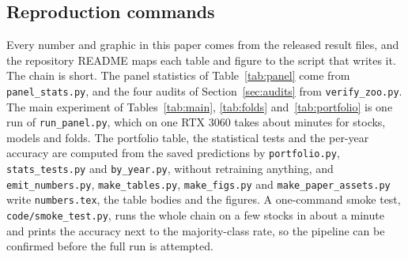 \documentclass[pdflatex,sn-mathphys-ay]{sn-jnl}
\theoremstyle{thmstyleone}%
\theoremstyle{thmstyletwo}%
\theoremstyle{thmstyletwo}%
\begin{document}
\begin{appendices}
	\section{Reproduction commands}\label{app1}

	Every number and graphic in this paper comes from the released result files, and the repository
	README maps each table and figure to the script that writes it. The chain is short. The panel
	statistics of Table~\ref{tab:panel} come from \texttt{panel\_stats.py}, and the four audits of
	Section~\ref{sec:audits} from \texttt{verify\_zoo.py}. The main experiment of
	Tables~\ref{tab:main}, \ref{tab:folds} and~\ref{tab:portfolio} is one run of
	\texttt{run\_panel.py}, which on one RTX 3060 takes about \runMinutes{} minutes for \nStocks{}
	stocks, \nModels{} models and \nFolds{} folds. The portfolio table, the statistical tests and the
	per-year accuracy are computed from the saved predictions by \texttt{portfolio.py},
	\texttt{stats\_tests.py} and \texttt{by\_year.py}, without retraining anything, and
	\texttt{emit\_numbers.py}, \texttt{make\_tables.py}, \texttt{make\_figs.py} and
	\texttt{make\_paper\_assets.py} write \texttt{numbers.tex}, the table bodies and the figures. A
	one-command smoke test, \texttt{code/smoke\_test.py}, runs the whole chain on a few stocks in about
	a minute and prints the accuracy next to the majority-class rate, so the pipeline can be confirmed
	before the full run is attempted.
\end{appendices}

\newpage

\end{document}
